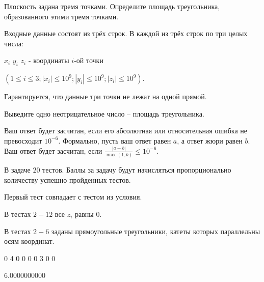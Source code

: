 
Плоскость задана тремя точками. Определите площадь треугольника, образованного этими тремя точками.


Входные данные состоят из трёх строк. В каждой из трёх строк по три целых числа:

$x_i$ $y_i$ $z_i$ - координаты $i$-ой точки

$(1 \leq i \leq 3; |x_{i}| \leq 10^{9}; |y_{i}| \leq 10^{9}; |z_{i}| \leq 10^{9})$.

Гарантируется, что данные три точки не лежат на одной прямой.

\outputfmtSection

Выведите одно неотрицательное число – площадь треугольника.

Ваш ответ будет засчитан, если его абсолютная или относительная ошибка не превосходит 
$10^{-6}$. Формально, пусть ваш ответ равен $a$, а ответ жюри равен $b$. Ваш ответ будет засчитан, 
если $\frac {|a - b|}{\max(1, b)} \le 10^{-6}$.

\markSection

В задаче $20$ тестов. Баллы за задачу будут начисляться пропорционально количеству успешно 
пройденных тестов.

Первый тест совпадает с тестом из условия.

В тестах $2-12$ все $z_i$ равны $0$.

В тестах $2-6$ заданы прямоугольные треугольники, катеты которых параллельны осям координат.


\begin{myverbbox}[\small]{\vinput}
    0 4 0
    0 0 0
    3 0 0
\end{myverbbox}
\begin{myverbbox}[\small]{\voutput}
    6.0000000000
\end{myverbbox}

